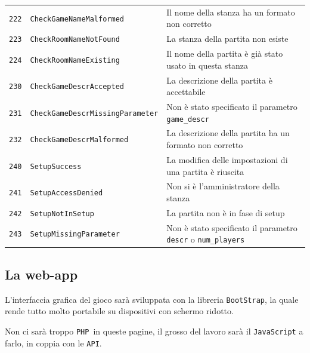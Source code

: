 \documentclass[10pt,a4paper]{article}
\newcommand{\lang}[1]{\texttt{#1}}
\newcommand{\PHP}{\lang{PHP}}
\newcommand{\API}{\texttt{API}}
\newcommand{\apicode}[3]{
\texttt{#1} & \texttt{#2} & #3 \\
}
\begin{document}
{\begin{tabular}{|rl|l|}
\apicode{222}{CheckGameNameMalformed}{Il nome della stanza ha un formato non corretto}
\apicode{223}{CheckRoomNameNotFound}{La stanza della partita non esiste}
\apicode{224}{CheckRoomNameExisting}{Il nome della partita è già stato usato in questa stanza}
\hline
\apicode{230}{CheckGameDescrAccepted}{La descrizione della partita è accettabile}
\apicode{231}{CheckGameDescrMissingParameter}{Non è stato specificato il parametro \texttt{game\_descr}}
\apicode{232}{CheckGameDescrMalformed}{La descrizione della partita ha un formato non corretto}
\hline
\apicode{240}{SetupSuccess}{La modifica delle impostazioni di una partita è riuscita}
\apicode{241}{SetupAccessDenied}{Non si è l'amministratore della stanza}
\apicode{242}{SetupNotInSetup}{La partita non è in fase di setup}
\apicode{243}{SetupMissingParameter}{Non è stato specificato il parametro \texttt{descr} o \texttt{num\_players}}
\hline
\end{tabular}
}

\subsection{La web-app}
L'interfaccia grafica del gioco sarà sviluppata con la libreria \texttt{BootStrap}, la quale rende tutto molto portabile su dispositivi con schermo ridotto. 

Non ci sarà troppo \PHP\ in queste pagine, il grosso del lavoro sarà il \lang{JavaScript} a farlo, in coppia con le \API.
\end{document}
